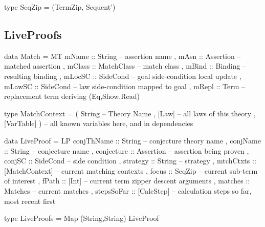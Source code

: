 \begin{code}
type SeqZip = (TermZip, Sequent')
\end{code}

\subsection{LiveProofs}

\begin{code}
data Match
 = MT { mName  ::  String     -- assertion name
      , mAsn   ::  Assertion  -- matched assertion
      , mClass ::  MatchClass -- match class
      , mBind  ::  Binding    -- resulting binding
      , mLocSC ::  SideCond   -- goal side-condition local update
      , mLawSC ::  SideCond   -- law side-condition mapped to goal
      , mRepl  ::  Term       -- replacement term
      } deriving (Eq,Show,Read)
\end{code}

\begin{code}
type MatchContext
  = ( String       -- Theory Name
    , [Law]        -- all laws of this theory
    , [VarTable] ) -- all known variables here, and in dependencies
\end{code}

\begin{code}
data LiveProof
  = LP {
      conjThName :: String -- conjecture theory name
    , conjName :: String -- conjecture name
    , conjecture :: Assertion -- assertion being proven
    , conjSC :: SideCond -- side condition
    , strategy :: String -- strategy
    , mtchCtxts :: [MatchContext] -- current matching contexts
    , focus :: SeqZip  -- current sub-term of interest
    , fPath :: [Int] -- current term zipper descent arguments
    , matches :: Matches -- current matches
    , stepsSoFar :: [CalcStep]  -- calculation steps so far, most recent first
    }
\end{code}

\begin{code}
type LiveProofs = Map (String,String) LiveProof
\end{code}

